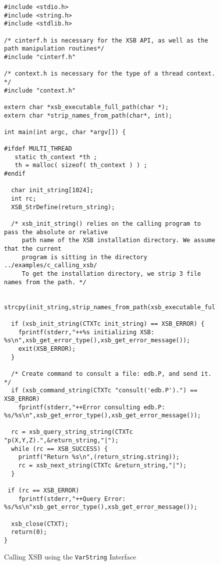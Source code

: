 \begin{figure}[hbtp]
\begin{small}
\begin{verbatim}
#include <stdio.h>
#include <string.h>
#include <stdlib.h>

/* cinterf.h is necessary for the XSB API, as well as the path manipulation routines*/
#include "cinterf.h"

/* context.h is necessary for the type of a thread context. */
#include "context.h"

extern char *xsb_executable_full_path(char *);
extern char *strip_names_from_path(char*, int);

int main(int argc, char *argv[]) { 

#ifdef MULTI_THREAD
   static th_context *th ;
   th = malloc( sizeof( th_context ) ) ;  
#endif

  char init_string[1024];
  int rc;
  XSB_StrDefine(return_string);

  /* xsb_init_string() relies on the calling program to pass the absolute or relative
     path name of the XSB installation directory. We assume that the current
     program is sitting in the directory ../examples/c_calling_xsb/
     To get the installation directory, we strip 3 file names from the path. */

  strcpy(init_string,strip_names_from_path(xsb_executable_full_path(argv[0]),3));

  if (xsb_init_string(CTXTc init_string) == XSB_ERROR) {
    fprintf(stderr,"++%s initializing XSB: %s\n",xsb_get_error_type(),xsb_get_error_message());
    exit(XSB_ERROR);
  }

  /* Create command to consult a file: edb.P, and send it. */
  if (xsb_command_string(CTXTc "consult('edb.P').") == XSB_ERROR)
    fprintf(stderr,"++Error consulting edb.P: %s/%s\n",xsb_get_error_type(),xsb_get_error_message());

  rc = xsb_query_string_string(CTXTc "p(X,Y,Z).",&return_string,"|");
  while (rc == XSB_SUCCESS) {
    printf("Return %s\n",(return_string.string));
    rc = xsb_next_string(CTXTc &return_string,"|");
  }
 
 if (rc == XSB_ERROR) 
    fprintf(stderr,"++Query Error: %s/%s\n"xsb_get_error_type(),xsb_get_error_message());

  xsb_close(CTXT);     
  return(0);
}
\end{verbatim}
\end{small}
\caption{Calling XSB using the {\tt VarString} Interface} \label{fig:varstringex}
\end{figure}

